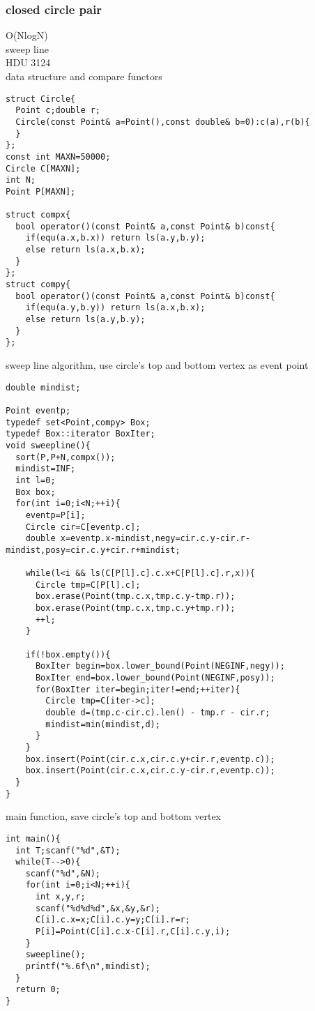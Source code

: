 \documentclass[a4paper]{article}
\begin{document}
\subsubsection{closed circle pair}
O(NlogN) \\ 
sweep line  \\
HDU 3124  \\
data structure and compare functors
\begin{lstlisting}
struct Circle{
  Point c;double r;
  Circle(const Point& a=Point(),const double& b=0):c(a),r(b){
  }
};
const int MAXN=50000;
Circle C[MAXN];
int N;
Point P[MAXN];

struct compx{
  bool operator()(const Point& a,const Point& b)const{
    if(equ(a.x,b.x)) return ls(a.y,b.y);
    else return ls(a.x,b.x);
  }
};
struct compy{
  bool operator()(const Point& a,const Point& b)const{
    if(equ(a.y,b.y)) return ls(a.x,b.x);
    else return ls(a.y,b.y);
  }
};
\end{lstlisting}
sweep line algorithm, use circle's top and bottom vertex as event
point
\begin{lstlisting}
double mindist;

Point eventp;
typedef set<Point,compy> Box;
typedef Box::iterator BoxIter;
void sweepline(){
  sort(P,P+N,compx());
  mindist=INF;
  int l=0;
  Box box;
  for(int i=0;i<N;++i){
    eventp=P[i];
    Circle cir=C[eventp.c];
    double x=eventp.x-mindist,negy=cir.c.y-cir.r-mindist,posy=cir.c.y+cir.r+mindist;

    while(l<i && ls(C[P[l].c].c.x+C[P[l].c].r,x)){
      Circle tmp=C[P[l].c];
      box.erase(Point(tmp.c.x,tmp.c.y-tmp.r));
      box.erase(Point(tmp.c.x,tmp.c.y+tmp.r));
      ++l;
    }
    
    if(!box.empty()){
      BoxIter begin=box.lower_bound(Point(NEGINF,negy));
      BoxIter end=box.lower_bound(Point(NEGINF,posy));
      for(BoxIter iter=begin;iter!=end;++iter){
        Circle tmp=C[iter->c];
        double d=(tmp.c-cir.c).len() - tmp.r - cir.r;
        mindist=min(mindist,d);
      }
    }
    box.insert(Point(cir.c.x,cir.c.y+cir.r,eventp.c));
    box.insert(Point(cir.c.x,cir.c.y-cir.r,eventp.c));
  }
}
\end{lstlisting}
main function, save circle's top and bottom vertex
\begin{lstlisting}
int main(){
  int T;scanf("%d",&T);
  while(T-->0){
    scanf("%d",&N);
    for(int i=0;i<N;++i){
      int x,y,r;
      scanf("%d%d%d",&x,&y,&r);
      C[i].c.x=x;C[i].c.y=y;C[i].r=r;
      P[i]=Point(C[i].c.x-C[i].r,C[i].c.y,i);
    }
    sweepline();
    printf("%.6f\n",mindist);
  }
  return 0;
}
\end{lstlisting}
\end{document}
